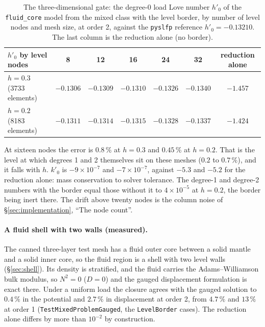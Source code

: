 \documentclass[11pt]{article}
\theoremstyle{definition}
\theoremstyle{remark}
\newcommand{\code}[1]{\texttt{#1}}
\begin{document}
\begin{table}[htbp]
\centering
\small
\caption{The three-dimensional gate: the degree-0 load Love number
$h'_0$ of the \code{fluid\_core} model from the mixed class with the
level border, by number of level nodes and mesh size, at order 2,
against the \code{pyslfp} reference $h'_0 = -0.13210$. The last column
is the reduction alone (no border).}
\label{tab:gate3d}
\begin{tabular}{@{}lcccccc@{}}
\toprule
$h'_0$ by level nodes & 8 & 12 & 16 & 24 & 32 & reduction alone \\
\midrule
$h = 0.3$ (3733 elements) & $-0.1306$ & $-0.1309$ & $-0.1310$ & $-0.1326$ & $-0.1340$ & $-1.457$ \\
$h = 0.2$ (8183 elements) & $-0.1311$ & $-0.1314$ & $-0.1315$ & $-0.1328$ & $-0.1337$ & $-1.424$ \\
\bottomrule
\end{tabular}
\end{table}

At sixteen nodes the error is $0.8\,\%$ at $h = 0.3$ and $0.45\,\%$ at
$h = 0.2$. That is the level at which degrees 1 and 2 themselves sit
on these meshes ($0.2$ to $0.7\,\%$), and it falls with $h$. $k'_0$ is
$-9\times10^{-7}$ and $-7\times10^{-7}$, against $-5.3$ and $-5.2$ for
the reduction alone: mass conservation to solver tolerance. The
degree-1 and degree-2 numbers with the border equal those without it
to $4\times10^{-5}$ at $h = 0.2$, the border being inert there. The
drift above twenty nodes is the column noise of
\S\ref{sec:implementation}, ``The node count''.

\paragraph{A fluid shell with two walls (measured).} The canned
three-layer test mesh has a fluid outer core between a solid mantle
and a solid inner core, so the fluid region is a shell with two level
walls (\S\ref{sec:shell}). Its density is stratified, and the fluid carries the
Adams--Williamson bulk modulus, so $N^2 = 0$ ($D = 0$) and the gauged
displacement formulation is exact there. Under a uniform load the
closure agrees with the gauged solution to $0.4\,\%$ in the potential
and $2.7\,\%$ in displacement at order 2, from $4.7\,\%$ and $13\,\%$ at
order 1 (\code{TestMixedProblemGauged}, the \code{LevelBorder}
cases). The reduction alone differs by more than $10^{-2}$ by
construction.
\end{document}
